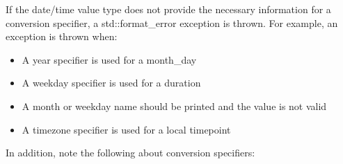 If the date/time value type does not provide the necessary information for a conversion specifier, a std::format\_error exception is thrown. For example, an exception is thrown when:

\begin{itemize}
\item 
A year specifier is used for a month\_day

\item 
A weekday specifier is used for a duration

\item 
A month or weekday name should be printed and the value is not valid

\item 
A timezone specifier is used for a local timepoint
\end{itemize}

In addition, note the following about conversion specifiers:

